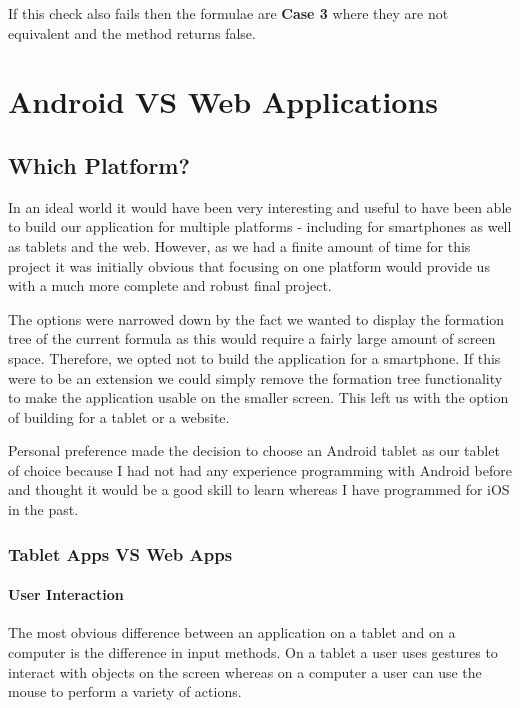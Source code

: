 \documentclass{report}
\begin{document}
If this check also fails then the formulae are \textbf{Case 3} where they are not equivalent and the method returns false.

\chapter{Android VS Web Applications}
\label{chap:android_vs_web}

\section{Which Platform?}

In an ideal world it would have been very interesting and useful to have been able to build our application for multiple platforms - including for smartphones as well as tablets and the web. However, as we had a finite amount of time for this project it was initially obvious that focusing on one platform would provide us with a much more complete and robust final project.

The options were narrowed down by the fact we wanted to display the formation tree of the current formula as this would require a fairly large amount of screen space. Therefore, we opted not to build the application for a smartphone. If this were to be an extension we could simply remove the formation tree functionality to make the application usable on the smaller screen. This left us with the option of building for a tablet or a website.

Personal preference made the decision to choose an Android tablet as our tablet of choice because I had not had any experience programming with Android before and thought it would be a good skill to learn whereas I have programmed for iOS in the past. 

\subsection{Tablet Apps VS Web Apps}

\subsubsection{User Interaction}

The most obvious difference between an application on a tablet and on a computer is the difference in input methods. On a tablet a user uses gestures to interact with objects on the screen whereas on a computer a user can use the mouse to perform a variety of actions.
\end{document}
